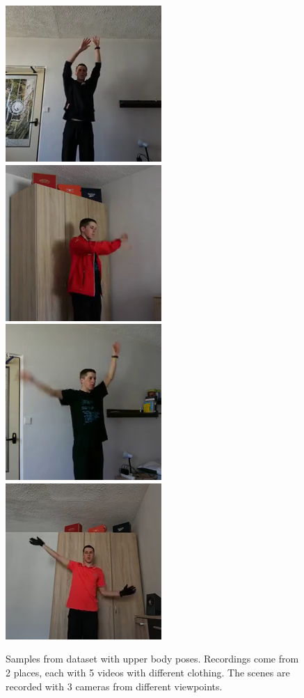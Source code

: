 \begin{figure}[!ht]
{    }
    \vspace{0.1cm}
    \centerline{
        \includegraphics[scale=0.46]{figures/dataset_upper_body/scene023_cam1_image00035.png}
        \includegraphics[scale=0.46]{figures/dataset_upper_body/scene028_cam0_image00247.png}
        \includegraphics[scale=0.46]{figures/dataset_upper_body/scene021_cam0_image00044.png}
        \includegraphics[scale=0.46]{figures/dataset_upper_body/scene029_cam1_image00142.png}
    }
    \caption{Samples from dataset with upper body poses. Recordings come from 2 places, each with 5 videos with different clothing. The scenes are recorded with 3 cameras from different viewpoints.}
    \label{fig:dataset-upper-body-example}
\end{figure}

